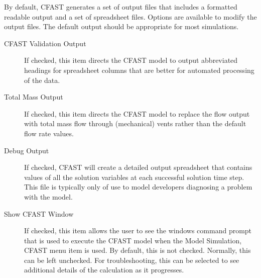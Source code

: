 By default, CFAST generates a set of output files that includes a formatted readable output and a set of spreadsheet files.  Options are available to modify the output files.  The default output should be appropriate for most simulations.

\begin{description}
    \item[CFAST Validation Output] If checked, this item directs the CFAST model to output abbreviated headings for spreadsheet columns that are better for automated processing of the data.
    \item[Total Mass Output] If checked, this item directs the CFAST model to replace the flow output with total mass flow through (mechanical) vents rather than the default flow rate values.
    \item[Debug Output] If checked, CFAST will create a detailed output spreadsheet that contains values of all the solution variables at each successful solution time step. This file is typically only of use to model developers diagnosing a problem with the model.
    \item[Show CFAST Window] If checked, this item allows the user to see the windows command prompt that is used to execute the CFAST model when the Model Simulation, CFAST menu item is used.  By default, this is not checked.  Normally, this can be left unchecked.  For troubleshooting, this can be selected to see additional details of the calculation as it progresses.
\end{description}

